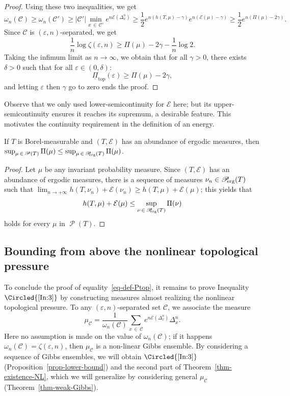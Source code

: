\documentclass[AHL, Unicode, longabstracts,published]{cedram}
\theoremstyle{plain}
\theoremstyle{plain}
\newcommand\eps{\varepsilon}
\newcommand\NLP{\Pi}
\newcommand\Proberg{\Prob_{\kern-3pt\mathrm{erg}}}
\renewcommand\top{{\mathrm{top}}}
\newcommand\Prob{{\operatorname{\mathscr{P}}}}
\newcounter{In}
\newcommand{\Inref}[1]{\Circled{\ref{#1}}}
\newcommand*\8{\infty}
\newcommand{\ninf}{{n\to+\8}}
\newcommand{\En}{\mathcal{E}}
\newcommand{\cC}{\mathcal C}
\begin{document}
\begin{proof}
Using these two inequalities, we get
\[
\omega_n(\cC) \ge \omega_n(\cC') \ge \lvert \cC'\rvert \min_{x\,\in\,\cC'} e^{n\En\left(\Delta_x^n\right)} \ge \frac12 e^{n\left(h(T,\mu)-\gamma\right)} e^{n\left(\En(\mu)-\gamma\right)} \ge \frac12 e^{n\left(\NLP(\mu)-2\gamma\right)}.
\]
Since $\cC$ is $(\eps,n)$-separated, we get
\[
\frac1n \log\zeta(\eps,n) \ge \NLP(\mu)-2\gamma -\frac1n \log 2.
\]
Taking the infimum limit as $n\to\infty$, we obtain that for all $\gamma>0$, there exists $\delta>0$ such that for all $\varepsilon\in(0,\delta)$:
\[
\underline{\NLP}_{\top}(\varepsilon)\ge \NLP(\mu)-2\gamma,
\]
and letting $\eps$ then $\gamma$ go to zero ends the proof.
\end{proof}

Observe that we only used lower-semicontinuity for $\En$ here; but its upper-semicontin\-uity ensures it reaches its supremum, a desirable feature. This motivates the continuity requirement in the definition of an energy.



\begin{prop}[Inequality $\Inref{In:4}$]\label{prop-ine probproberg}
If $T$ is Borel-measurable and $(T,\En)$ has an abundance of ergodic measures, then $\sup_{\mu\,\in\,\Prob(T)} \NLP(\mu) \le\sup_{\mu\,\in\,\Proberg(T)} \NLP(\mu)$.
\end{prop}


\begin{proof}
Let $\mu$ be any invariant probability measure.
{Since} $(T,\En)$ has an abundance of ergodic measures, there is a sequence of measures $\nu_n\in\Proberg(T)$ such that { $\lim_{\ninf} h(T,\nu_n)+\En(\nu_n) \ge h(T,\mu)+\En(\mu)$}; this yields that
\[
h(T,\mu)+\En(\mu) \le \sup_{\nu\,\in\,\Proberg(T)} \NLP(\nu)
\]
holds for every $\mu$ in $\Prob(T)$.
\end{proof}



\subsection{Bounding from above the nonlinear topological pressure}\label{sec-Gibbs}

To conclude the proof of equality~\eqref{eq-def-Ptop}, it remains to prove Inequality $\Inref{In:3}$ by constructing measures almost realizing the nonlinear topological pressure. To any $(\varepsilon,n)$-separated set $\cC$, we associate the measure
\begin{equation}\label{eq-muC}
\mu_{\cC} = \frac{1}{\omega_{n}(\cC)} \sum_{x\,\in\,\cC} e^{n\En\left(\Delta_x^{n}\right)} \Delta_x^{n}.
\end{equation}
Here no assumption is made on the value of $\omega_{n}(\cC)$; if it happens $\omega_n(\cC)=\zeta(\varepsilon,n)$, then $\mu_{\cC}$ is a non-linear Gibbs ensemble. By considering a sequence of Gibbs ensembles, we will obtain $\Inref{In:3}$ (Proposition~\ref{prop-lower-bound}) and the second part of Theorem~\ref{thm-existence-NL}, which we will generalize by considering general $\mu_{\cC}$ (Theorem~\ref{thm-weak-Gibbs}).
\end{document}

